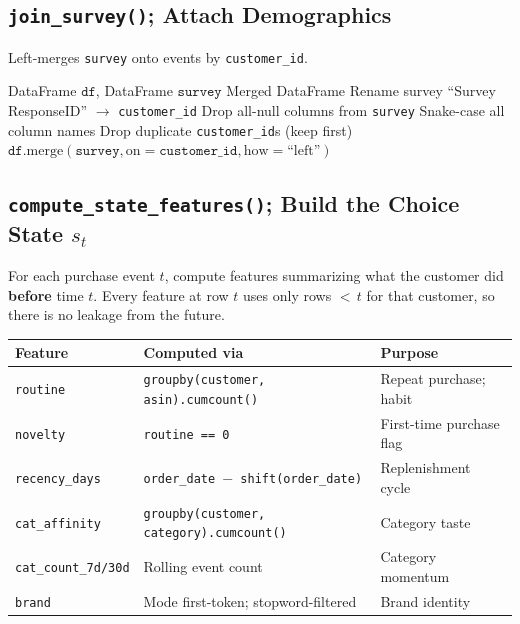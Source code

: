 \documentclass[11pt,a4paper]{article}
\begin{document}
\subsection{\texttt{join\_survey()}; Attach Demographics}

Left-merges \texttt{survey} onto events by \texttt{customer\_id}.

\begin{algorithm}[H]
\caption{\textsc{JoinSurvey}}\label{alg:join-survey}
\begin{algorithmic}[1]
\Require DataFrame $\texttt{df}$, DataFrame $\texttt{survey}$
\Ensure Merged DataFrame
\State Rename survey ``Survey ResponseID'' $\to$ \texttt{customer\_id}
\State Drop all-null columns from \texttt{survey}
\State Snake-case all column names
\State Drop duplicate \texttt{customer\_id}s (keep first)
\State \Return $\texttt{df}.\text{merge}(\texttt{survey}, \text{on}=\texttt{customer\_id}, \text{how}=\text{``left''})$
\end{algorithmic}
\end{algorithm}


\subsection{\texttt{compute\_state\_features()}; Build the Choice State $s_t$}

For each purchase event $t$, compute features summarizing what the customer did \textbf{before} time $t$.  Every feature at row $t$ uses only rows ${<}\,t$ for that customer, so there is no leakage from the future.

\begin{table}[H]\centering\tiny
\begin{tabularx}{\textwidth}{lXX}
\toprule
\textbf{Feature} & \textbf{Computed via} & \textbf{Purpose} \\
\midrule
\texttt{routine} & \texttt{groupby(customer, asin).cumcount()} & Repeat purchase; habit \\
\texttt{novelty} & \texttt{routine == 0} & First-time purchase flag \\
\texttt{recency\_days} & \texttt{order\_date $-$ shift(order\_date)} & Replenishment cycle \\
\texttt{cat\_affinity} & \texttt{groupby(customer, category).cumcount()} & Category taste \\
\texttt{cat\_count\_7d/30d} & Rolling event count & Category momentum \\
\texttt{brand} & Mode first-token; stopword-filtered & Brand identity \\
\bottomrule
\end{tabularx}
\end{table}
\end{document}
